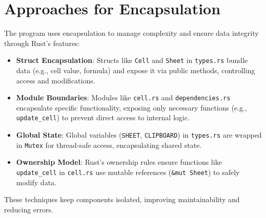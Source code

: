 \documentclass[12pt]{article}
\begin{document}
\section{Approaches for Encapsulation}
The program uses encapsulation to manage complexity and ensure data integrity through Rust’s features:
\begin{itemize}
    \item \textbf{Struct Encapsulation}: Structs like \texttt{Cell} and \texttt{Sheet} in \texttt{types.rs} bundle data (e.g., cell value, formula) and expose it via public methods, controlling access and modifications.
    \item \textbf{Module Boundaries}: Modules like \texttt{cell.rs} and \texttt{dependencies.rs} encapsulate specific functionality, exposing only necessary functions (e.g., \texttt{update\_cell}) to prevent direct access to internal logic.
    \item \textbf{Global State}: Global variables (\texttt{SHEET}, \texttt{CLIPBOARD}) in \texttt{types.rs} are wrapped in \texttt{Mutex} for thread-safe access, encapsulating shared state.
    \item \textbf{Ownership Model}: Rust’s ownership rules ensure functions like \texttt{update\_cell} in \texttt{cell.rs} use mutable references (\texttt{\&mut Sheet}) to safely modify data.
\end{itemize}
These techniques keep components isolated, improving maintainability and reducing errors.
\end{document}
